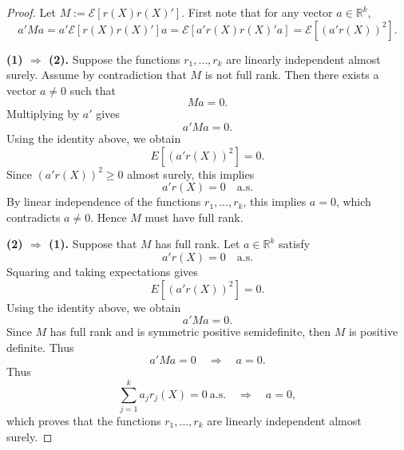 \documentclass[12pt]{article}
\renewcommand{\(}{\left(}%
\renewcommand{\)}{\right)}%
\renewcommand{\[}{\left[}%
\renewcommand{\]}{\right]}%
\newcommand{\e}{\mathscr{E}}
\newtheorem{proof}{Proof.}}
\begin{document}
\begin{proof}
Let $M:=\e[r(X)r(X)']$. First note that for any vector $a\in\mathbb{R}^k$,
\begin{equation*}
a'Ma
= a'\e[r(X)r(X)']a
= \e[a'r(X)r(X)'a]
= \e[(a'r(X))^2].
\end{equation*}

\medskip
\noindent
\textbf{(1) $\Rightarrow$ (2).}
Suppose the functions $r_1,\dots,r_k$ are linearly independent almost surely.
Assume by contradiction that $M$ is not full rank. Then there exists a vector
$a\neq 0$ such that
\begin{equation*}
Ma=0.
\end{equation*}
Multiplying by $a'$ gives
\begin{equation*}
a'Ma=0.
\end{equation*}
Using the identity above, we obtain
\begin{equation*}
E[(a'r(X))^2]=0.
\end{equation*}
Since $(a'r(X))^2\ge 0$ almost surely, this implies
\begin{equation*}
a'r(X)=0 \quad \text{a.s.}
\end{equation*}
By linear independence of the functions $r_1,\dots,r_k$, this implies $a=0$,
which contradicts $a\neq 0$. Hence $M$ must have full rank.

\medskip
\noindent
\textbf{(2) $\Rightarrow$ (1).}
Suppose that $M$ has full rank. Let $a\in\mathbb{R}^k$ satisfy
\begin{equation*}
a'r(X)=0 \quad \text{a.s.}
\end{equation*}
Squaring and taking expectations gives
\begin{equation*}
E[(a'r(X))^2]=0.
\end{equation*}
Using the identity above, we obtain
\begin{equation*}
a'Ma=0.
\end{equation*}
Since $M$ has full rank and is symmetric positive semidefinite, then $M$ is positive definite. Thus
\begin{equation*}
a'Ma=0 \quad \Rightarrow \quad a=0.
\end{equation*}
Thus
\begin{equation*}
\sum_{j=1}^k a_j r_j(X)=0 \ \text{a.s.} \quad \Rightarrow \quad a=0,
\end{equation*}
which proves that the functions $r_1,\dots,r_k$ are linearly independent almost surely.
\end{proof}
\end{document}
